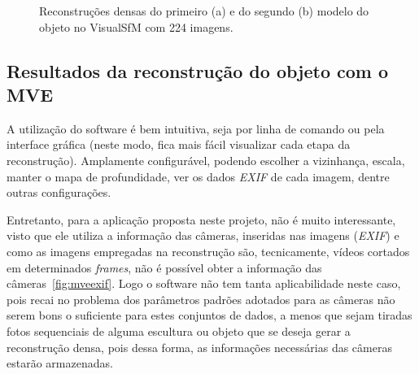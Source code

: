 \begin{figure}[!h]
	\centering
	\caption{Reconstruções densas do primeiro (a) e do segundo (b) modelo do objeto no VisualSfM com 224 imagens.
	}
\end{figure}


\subsection{Resultados da reconstrução do objeto com o MVE}

A utilização do software é bem intuitiva, seja por linha de comando ou pela interface gráfica (neste modo, fica mais fácil visualizar cada etapa da reconstrução). Amplamente configurável, podendo escolher a vizinhança, escala, manter o mapa de profundidade, ver os dados \emph{EXIF} de cada imagem, dentre outras configurações.

Entretanto, para a aplicação proposta neste projeto, não é muito interessante, visto que ele utiliza a informação das câmeras, inseridas nas imagens (\emph{EXIF}) e como as imagens empregadas na reconstrução são, tecnicamente, vídeos cortados em determinados \emph{frames}, não é possível obter a informação das câmeras~\ref{fig:mveexif}. Logo o software não tem tanta aplicabilidade neste caso, pois recai no problema dos parâmetros padrões adotados para as câmeras não serem bons o suficiente para estes conjuntos de dados, a menos que sejam tiradas fotos sequenciais de alguma escultura ou objeto que se deseja gerar a reconstrução densa, pois dessa forma, as informações necessárias das câmeras estarão armazenadas.

